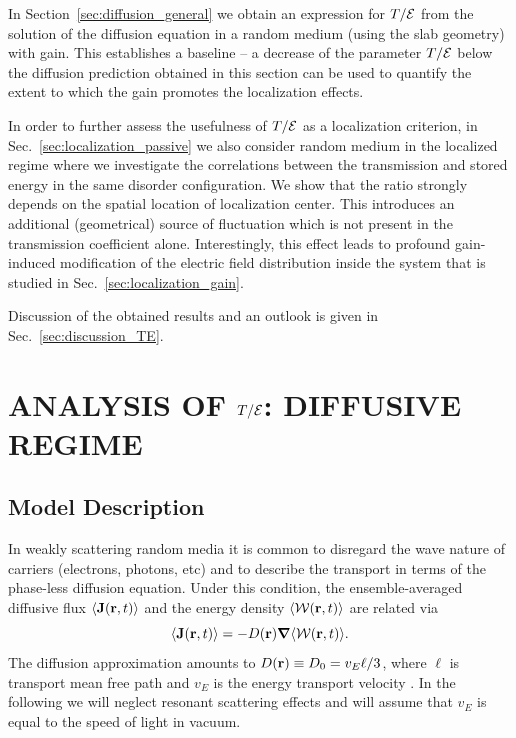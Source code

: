 In Section~\ref{sec:diffusion_general} we obtain an expression for $T/{\cal E}$ from the solution of the diffusion equation in a random medium (using the slab geometry) with gain. This establishes a baseline -- a decrease of the parameter $T/{\cal E}$ below the diffusion prediction obtained in this section can be used to quantify the extent to which the gain promotes the localization effects.

In order to further assess the usefulness of $T/{\cal E}$ as a localization criterion, in Sec.~\ref{sec:localization_passive} we also consider random medium in the localized regime where we investigate the correlations between the transmission and stored energy in the same disorder configuration. We show that the ratio strongly depends on the spatial location of localization center. This introduces an additional (geometrical) source of fluctuation which is not present in the transmission coefficient alone. Interestingly, this effect leads to profound gain-induced modification of the electric field distribution inside the system that is studied in Sec.~\ref{sec:localization_gain}. 

Discussion of the obtained results and an outlook is given in Sec.~\ref{sec:discussion_TE}.

\section{ANALYSIS OF \texorpdfstring{$T/{\cal E}$}{T/E}: DIFFUSIVE REGIME}
\label{sec:diffusion_section}

\subsection{Model Description}
\label{sec:diffusion_eq}

In weakly scattering random media it is common to disregard the wave nature of carriers (electrons, photons, etc) and to describe the transport in terms of the phase-less diffusion equation. Under this condition, the ensemble-averaged diffusive flux $\langle{\bf J}({\bf r},t)\rangle$ and the energy density $\langle {\cal W}({\bf r},t)\rangle$ are related via\cite{1953_Morse}
\begin{equation}
\langle{\bf J}({\bf r},t)\rangle=-D({\bf r})\mbox{\boldmath$\nabla$}\langle {\cal W}({\bf r},t)\rangle.
\label{eq:Jflux}
\end{equation}
The diffusion approximation amounts to $D({\bf r})\equiv D_0=v_E \ell/3$, where $\ell$ is transport mean free path and $v_E$ is the energy transport velocity \cite{1991_van_Albada_vE}. In the following we will neglect resonant scattering effects and will assume that $v_E$ is equal to the speed of light in vacuum. 

